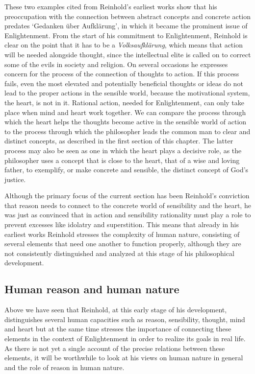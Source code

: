  These two examples cited from Reinhold's earliest works show that his preoccupation with the connection between abstract concepts and concrete action predates `Gedanken \"{u}ber Aufkl\"{a}rung', in which it became the prominent issue of Enlightenment. From the start of his commitment to Enlightenment, Reinhold is clear on the point that it has to be a \textit{Volksaufkl\"{a}rung}, which means that action will be needed alongside thought, since the intellectual elite is called on to correct some of the evils in society and religion. On several occasions he expresses concern for the process of the connection of thoughts to action. If this process fails, even the most elevated and potentially beneficial thoughts or ideas do not lead to the proper actions in the sensible world, because the motivational system, the heart, is not in it. Rational action, needed for Enlightenment, can only take place when mind and heart work together. We can compare the process through which the heart helps the thoughts become active in the sensible world of action to the process through which the philosopher leads the common man to clear and distinct concepts, as described in the first section of this chapter. The latter process may also be seen as one in which the heart plays a decisive role, as the philosopher uses a concept that is close to the heart, that of a wise and loving father, to exemplify, or make concrete and sensible, the distinct concept of God's justice. 

 Although the primary focus of the current section has been Reinhold's conviction that reason needs to connect to the concrete world of sensibility and the heart, he was just as convinced that in action and sensibility rationality must play a role to prevent excesses like idolatry and superstition. This means that already in his earliest works Reinhold stresses the complexity of human nature, consisting of several elements that need one another to function properly, although they are not consistently distinguished and analyzed at this stage of his philosophical development. 


\subsection{Human reason and human nature }


Above we have seen that Reinhold, at this early stage of his development, distinguishes several human capacities such as reason, sensibility, thought, mind and heart but at the same time stresses the importance of connecting these elements in the context of Enlightenment in order to realize its goals in real life. As there is not yet a single account of the precise relations between these elements, it will be worthwhile to look at his views on human nature in general and the role of reason in human nature.  

